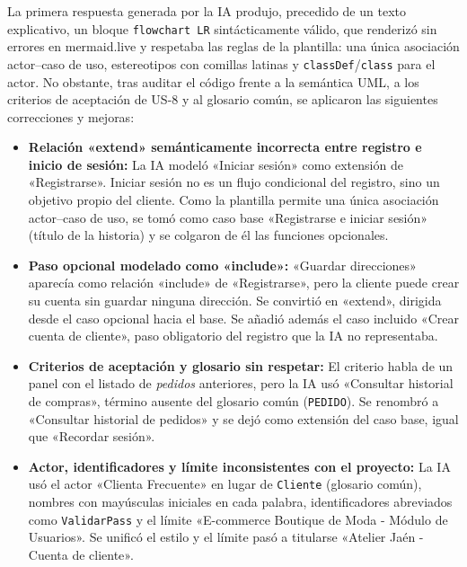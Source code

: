 La primera respuesta generada por la IA produjo, precedido de un texto explicativo, un bloque \texttt{flowchart LR} sintácticamente válido, que renderizó sin errores en mermaid.live y respetaba las reglas de la plantilla: una única asociación actor--caso de uso, estereotipos con comillas latinas y \texttt{classDef}/\texttt{class} para el actor. No obstante, tras auditar el código frente a la semántica UML, a los criterios de aceptación de US-8 y al glosario común, se aplicaron las siguientes correcciones y mejoras:
\begin{itemize}[leftmargin=*,nosep]
\item \textbf{Relación «extend» semánticamente incorrecta entre registro e inicio de sesión:} La IA modeló «Iniciar sesión» como extensión de «Registrarse». Iniciar sesión no es un flujo condicional del registro, sino un objetivo propio del cliente. Como la plantilla permite una única asociación actor--caso de uso, se tomó como caso base «Registrarse e iniciar sesión» (título de la historia) y se colgaron de él las funciones opcionales.
\item \textbf{Paso opcional modelado como «include»:} «Guardar direcciones» aparecía como relación «include» de «Registrarse», pero la cliente puede crear su cuenta sin guardar ninguna dirección. Se convirtió en «extend», dirigida desde el caso opcional hacia el base. Se añadió además el caso incluido «Crear cuenta de cliente», paso obligatorio del registro que la IA no representaba.
\item \textbf{Criterios de aceptación y glosario sin respetar:} El criterio habla de un panel con el listado de \emph{pedidos} anteriores, pero la IA usó «Consultar historial de compras», término ausente del glosario común (\texttt{PEDIDO}). Se renombró a «Consultar historial de pedidos» y se dejó como extensión del caso base, igual que «Recordar sesión».
\item \textbf{Actor, identificadores y límite inconsistentes con el proyecto:} La IA usó el actor «Clienta Frecuente» en lugar de \texttt{Cliente} (glosario común), nombres con mayúsculas iniciales en cada palabra, identificadores abreviados como \texttt{ValidarPass} y el límite «E-commerce Boutique de Moda - Módulo de Usuarios». Se unificó el estilo y el límite pasó a titularse «Atelier Jaén - Cuenta de cliente».
\end{itemize}
